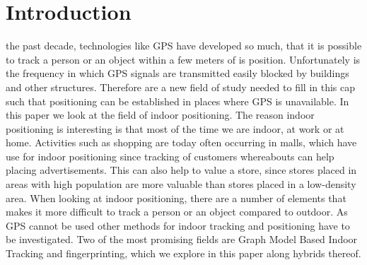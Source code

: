 \section{Introduction}
 the past decade, technologies like GPS have developed so much, that it is possible to track a person or an object within a few meters of is position. 
Unfortunately is the frequency in which GPS signals are transmitted easily blocked by buildings and other structures. 
Therefore are a new field of study needed to fill in this cap such that positioning can be established in places where GPS is unavailable.
In this paper we look at the field of indoor positioning. 
The reason indoor positioning is interesting is that most of the time we are indoor, at work or at home. 
Activities such as shopping are today often occurring in malls, which have use for indoor positioning since tracking of customers whereabouts can help placing advertisements. 
This can also help to value a store, since stores placed in areas with high population are more valuable than stores placed in a low-density area.
When looking at indoor positioning, there are a number of elements that makes it more difficult to track a person or an object compared to outdoor.
As GPS cannot be used other methods for indoor tracking and positioning have to be investigated. 
Two of the most promising fields are Graph Model Based Indoor Tracking and fingerprinting, which we explore in this paper along hybrids thereof. 




